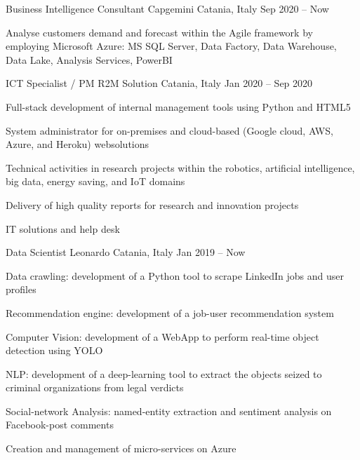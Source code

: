 
  \begin{cventries}
    \cventry
    {Business Intelligence Consultant}
    {Capgemini}    
    {Catania, Italy}
    {Sep 2020 -- Now}
    {
      \begin{cvitems}
        \item {
          Analyse customers demand and forecast within the Agile framework by employing Microsoft Azure: 
          MS SQL Server, Data Factory, Data Warehouse, Data Lake, Analysis Services, PowerBI
        }
      \end{cvitems}
    }

    \cventry
    {ICT Specialist / PM}
    {R2M Solution}    
    {Catania, Italy}
    {Jan 2020 -- Sep 2020}
    {
      \begin{cvitems}
        \item {Full-stack development of internal management tools using Python and HTML5}
        \item {System administrator for on-premises and cloud-based (Google cloud, AWS, Azure, and Heroku) websolutions}
        \item {Technical activities in research projects within the robotics, artificial intelligence, big data, energy saving, and IoT domains}
        \item {Delivery of high quality reports for research and innovation projects}
        \item {IT solutions and help desk}
      \end{cvitems}
    }


    \cventry
    {Data Scientist}
    {Leonardo}    
    {Catania, Italy}
    {Jan 2019 -- Now}
    {
      \begin{cvitems}
        \item {Data crawling: development of a Python tool to scrape LinkedIn jobs and user profiles}
        \item {Recommendation engine: development of a job-user recommendation system}
        \item {Computer Vision: development of a WebApp to perform real-time object detection using YOLO}
        \item {NLP: development of a deep-learning tool to extract the objects seized to criminal organizations from legal verdicts}
        \item {Social-network Analysis: named-entity extraction and sentiment analysis on Facebook-post comments}
        \item {Creation and management of micro-services on Azure}
      \end{cvitems}
    }


\end{cventries}
